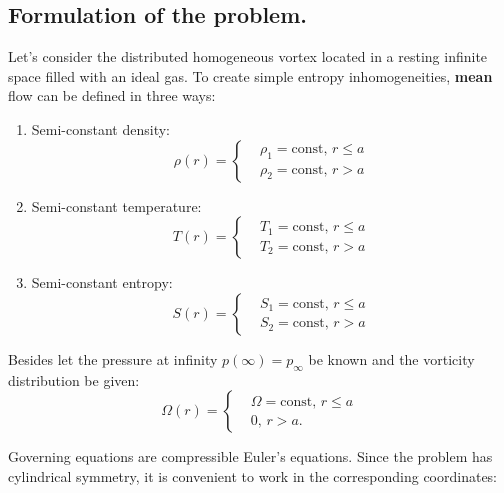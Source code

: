 \subsection{Formulation of the problem.}

Let's consider the distributed homogeneous vortex located in a resting infinite space filled with an ideal gas. To create simple entropy inhomogeneities, \textbf{mean} flow can be defined in three ways:
\begin{enumerate}
	\item Semi-constant density:
	\begin{equation}
		\label{hv-rho}
		\rho(r) = \left\{
		\begin{aligned}
			& \rho_1 = \text{const}, \, r \leqslant a \\
			& \rho_2 = \text{const}, \, r > a
		\end{aligned}
		\right.
	\end{equation}
	\item Semi-constant temperature:
	\begin{equation}
		\label{hv-temp}
		T(r) = \left\{
		\begin{aligned}
			& T_1 = \text{const}, \, r \leqslant a \\
			& T_2 = \text{const}, \, r > a
		\end{aligned}
		\right.
	\end{equation}
	\item Semi-constant entropy:
	\begin{equation}
		\label{hv-ent}
		S(r) = \left\{
		\begin{aligned}
			& S_1 = \text{const}, \, r \leqslant a \\
			& S_2 = \text{const}, \, r > a
		\end{aligned}
		\right.
	\end{equation}
\end{enumerate}

Besides let the pressure at infinity $p(\infty) = p_{\infty}$ be known and the vorticity distribution be given:
\begin{equation}
	\Omega(r) = \left\{
	\begin{aligned}
		& \Omega = \text{const}, \, r \leqslant a \\
		& 0, \, r > a.
	\end{aligned}
	\right.
\end{equation}

Governing equations are compressible Euler's equations. Since the problem has cylindrical symmetry, it is convenient to work in the corresponding coordinates:

